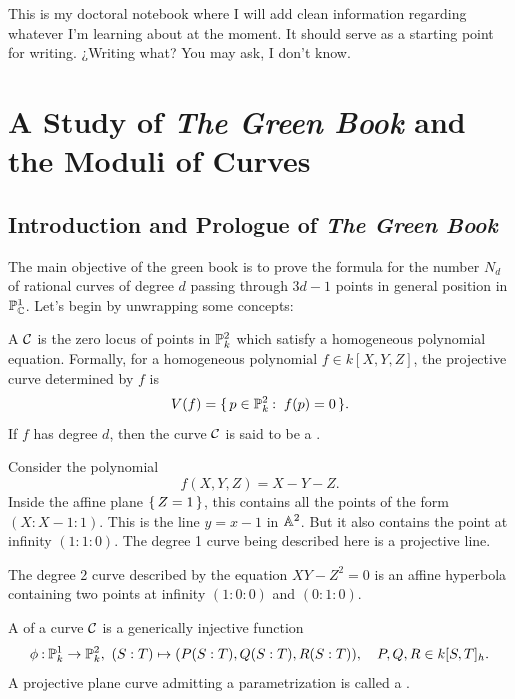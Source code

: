 \documentclass[12pt]{memoir}
\author{\nauthor}
\begin{document}
{\small 
\setlength{\parindent}{0em}
\setlength{\parskip}{1em}

This is my doctoral notebook where I will add clean information regarding whatever I'm learning about at the moment. It should serve as a starting point for writing. ¿Writing what? You may ask, I don't know.
}
\newpage
\tableofcontents
\chapter{A Study of \emph{The Green Book} and the Moduli of Curves}

\section{Introduction and Prologue of \emph{The Green Book}}

The main objective of the green book is to prove the formula for the number $N_d$ of rational curves of degree $d$ passing through $3d-1$ points in general position in $\mathbb{P}_{\mathbb{C}}^1$. Let's begin by unwrapping some concepts:

\begin{Def}
A  $\mathcal{C}$ is the zero locus of points in $\mathbb{P}^2_k$ which satisfy a homogeneous polynomial equation. Formally, for a homogeneous polynomial $f\in k[X,Y,Z]$, the projective curve determined by $f$ is
$$V(f)=\set{p\in\bP^2_k\:\ f(p)=0}.$$
If $f$ has degree $d$, then the curve $\mathcal{C}$ is said to be a .
\end{Def}

\begin{Ex}
Consider the polynomial 
$$f(X,Y,Z)=X-Y-Z.$$
Inside the affine plane $\{\,Z=1\,\}$, this contains all the points of the form $(X:X-1:1)$. This is the line $y=x-1$ in $\mathbb{A}^2$. But it also contains the point at infinity $(1:1:0)$. The degree 1 curve being described here is a projective line.
\end{Ex}

\begin{Ex}
    The degree 2 curve described by the equation $XY-Z^2=0$ is an affine hyperbola containing two points at infinity $(1:0:0)$ and $(0:1:0)$. 
\end{Ex}

\begin{Def}
A  of a curve $\mathcal{C}$ is a generically injective function $$\phi\:\bP^1_k\to\bP^2_k,\ (S:T)\mapsto(P(S:T),Q(S:T),R(S:T)),\quad P,Q,R\in k[S,T]_h.$$
A projective plane curve admitting a parametrization is called a .
\end{Def}
\end{document}
